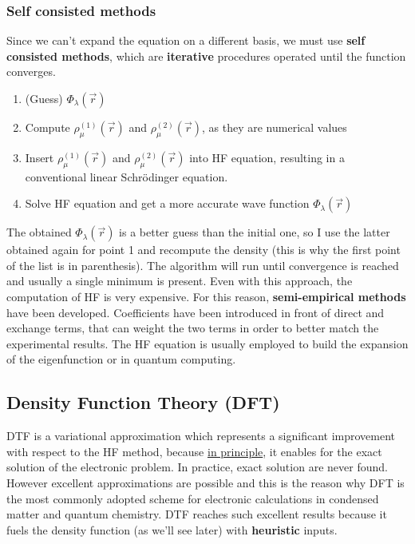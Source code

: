 		\subsubsection{Self consisted methods}
		Since we can't expand the equation on a different basis, we must use \textbf{self consisted methods}, which are \textbf{iterative} procedures operated until the function converges.

		\begin{multicols}{2}
			\begin{enumerate}
				\item (Guess) $\Phi_\lambda (\vec{r})$
				\item Compute $\rho_\mu^{(1)}(\vec{r})$ and $\rho_\mu^{(2)}(\vec{r})$, as they are numerical values
				\item Insert $\rho_\mu^{(1)}(\vec{r})$ and $\rho_\mu^{(2)}(\vec{r})$ into HF equation, resulting in a conventional linear Schr\"odinger equation.
				\item Solve HF equation and get a more accurate wave function $\Phi_\lambda (\vec{r})$
			\end{enumerate}
		\end{multicols}

		The obtained $\Phi_\lambda (\vec{r})$ is a better guess than the initial one, so I use the latter obtained again for point 1 and recompute the density (this is why the first point of the list is in parenthesis).
		The algorithm will run until convergence is reached and usually a single minimum is present.
		Even with this approach, the computation of HF is very expensive.
		For this reason, \textbf{semi-empirical methods} have been developed.
		Coefficients have been introduced in front of direct and exchange terms, that can weight the two terms in order to better match the experimental results.
		The HF equation is usually employed to build the expansion of the eigenfunction or in quantum computing.

	\subsection{Density Function Theory (DFT)}
	DTF is a variational approximation which represents a significant improvement with respect to the HF method, because \underline{in principle}, it enables for the exact solution of the electronic problem.
	In practice, exact solution are never found.
	However excellent approximations are possible and this is the reason why DFT is the most commonly adopted scheme for electronic calculations in condensed matter and quantum chemistry.
	DTF reaches such excellent results because it fuels the density function (as we'll see later) with \textbf{heuristic} inputs.


